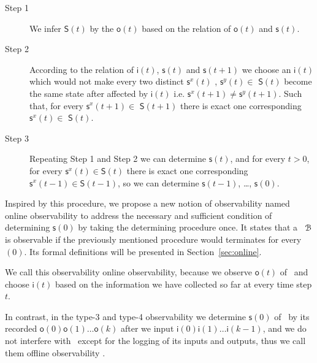 \begin{description}
	\item[Step 1] We infer $\mathsf{S}(t)$ by the $\mathsf{o}(t)$ based on the relation of $\mathsf{o}(t)$ and $\mathsf{s}(t)$.
	\item[Step 2] According to the relation of $\mathsf{i}(t)$, $\mathsf{s}(t)$ and $\mathsf{s}(t+1)$ we choose an $\mathsf{i}(t)$ which would not make every two distinct $\mathsf{s}^{x}(t)$ , $\mathsf{s}^{y}(t)$$\in$ $\mathsf{S}(t)$ become the same state after affected by $\mathsf{i}(t)$ i.e. $\mathsf{s}^{x}(t+1)\ne\mathsf{s}^{y}(t+1)$. Such that, for every $\mathsf{s}^{x}(t+1)\in $ $\mathsf{S}(t+1)$ there is exact one corresponding $\mathsf{s}^{x}(t)\in $ $\mathsf{S}(t)$.
	\item[Step 3] Repeating Step 1 and Step 2 we can determine $\mathsf{s}(t)$, and for every $t>0$, for every $\mathsf{s}^{x}(t)\in \mathsf{S}(t)$ there is exact one corresponding $\mathsf{s}^{x}(t-1)\in \mathsf{S}(t-1)$, so we can determine $\mathsf{s}(t-1)$, \ldots, $\mathsf{s}(0)$.
\end{description}



Inspired by this procedure, we propose a new notion of observability named online observability to address the necessary and sufficient condition of determining $\mathsf{s}(0)$ by taking the determining procedure once. It states that a \BCN\ ${\mathcal{B}}$ is observable if the previously mentioned procedure would terminates for every \State$(0)$. Its formal definitions will be presented in Section~\ref{sec:online}. 

We call this observability online observability, because we observe $\mathsf{o}(t)$ of \BCN\ and choose $\mathsf{i}(t)$ based on the information we have collected so far at every time step $t$. 

In contrast, in the type-3 and type-4 observability we determine $\mathsf{s}(0)$ of \BCN\ by its recorded $\mathsf{o}(0)\mathsf{o}(1)\ldots\mathsf{o}(k)$ after we input $\mathsf{i}(0)\mathsf{i}(1)\ldots\mathsf{i}(k-1)$, and  we do not interfere with \BCN\ except for the logging of its inputs and outputs, thus we call them offline observability \cite{Cassar2017A}. %

